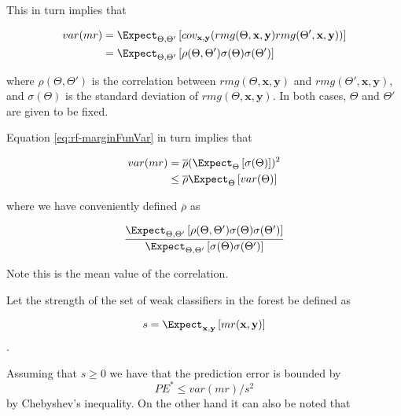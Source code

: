 This in turn implies that

\begin{equation}\label{eq:rf-marginFunVar}
\begin{split}
var(mr) & =  \Expect_{\Theta, \Theta'} 
\left[ 
cov_{\textbf{x},\textbf{y}}
(rmg(\Theta,\textbf{x},\textbf{y} )rmg(\Theta',\textbf{x},\textbf{y} )) 
\right] \\
& =  \Expect_{\Theta, \Theta'}
\left[ 
\rho(\Theta, \Theta')\sigma(\Theta)\sigma(\Theta')
\right] 
\end{split}
\end{equation}

where $ \rho(\Theta, \Theta')$ is the correlation between $rmg(\Theta,\textbf{x},\textbf{y})$ and $rmg(\Theta',\textbf{x},\textbf{y})$, and $\sigma(\Theta)$ is the standard deviation of $rmg(\Theta,\textbf{x},\textbf{y})$. In both cases, $\Theta$ and $\Theta'$ are given to be fixed. 

Equation \ref{eq:rf-marginFunVar} in turn implies that 

\begin{equation}\label{eq:rf-varianceBound}
\begin{split}
var(mr) & =  \overline{\rho} (\Expect_{\Theta}\left[ \sigma(\Theta)\right] )^2 \\
& \leq  \overline{\rho} \Expect_{\Theta} \left[ var(\Theta) \right] 
\end{split}
\end{equation}

where we have conveniently defined $\overline{\rho}$ as 

\begin{equation}\label{eq:rf-meanCorrelation}
\frac{\Expect_{\Theta, \Theta'} \left[ \rho(\Theta, \Theta') \sigma(\Theta) \sigma(\Theta')\right]}
{\Expect_{\Theta, \Theta'} \left[ \sigma(\Theta) \sigma(\Theta')\right]}
\end{equation}

Note this is the mean value of the correlation.

Let the strength of the set of weak classifiers in the forest be defined as 

$$s =  \Expect_{\textbf{x},\textbf{y}} \left[ mr(\textbf{x},\textbf{y} ) \right] $$.\label{eq:rf-strength}

Assuming that $s \geq 0$ we have that the prediction error is bounded by 
\begin{equation}\label{eq:rf-predictiveErrorBound1}
PE^* \leq var(mr)/s^2
\end{equation}
by Chebyshev's inequality. On the other hand it can also be noted that


